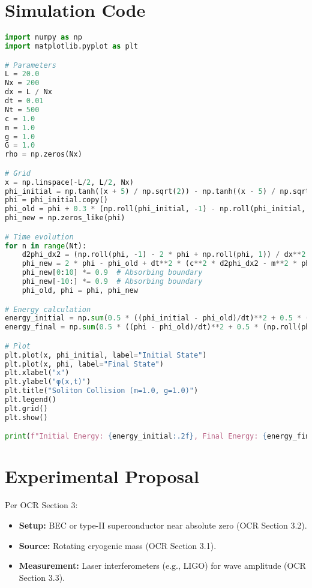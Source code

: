 \documentclass{article}
\begin{document}
\section{Simulation Code}
\begin{lstlisting}[language=Python, caption=Soliton Collision Simulation, label=lst:soliton]
import numpy as np
import matplotlib.pyplot as plt

# Parameters
L = 20.0
Nx = 200
dx = L / Nx
dt = 0.01
Nt = 500
c = 1.0
m = 1.0
g = 1.0
G = 1.0
rho = np.zeros(Nx)

# Grid
x = np.linspace(-L/2, L/2, Nx)
phi_initial = np.tanh((x + 5) / np.sqrt(2)) - np.tanh((x - 5) / np.sqrt(2))
phi = phi_initial.copy()
phi_old = phi + 0.3 * (np.roll(phi_initial, -1) - np.roll(phi_initial, 1)) / (2 * dx) * dt  # v1=0.3, v2=-0.3
phi_new = np.zeros_like(phi)

# Time evolution
for n in range(Nt):
    d2phi_dx2 = (np.roll(phi, -1) - 2 * phi + np.roll(phi, 1)) / dx**2  # Periodic boundaries
    phi_new = 2 * phi - phi_old + dt**2 * (c**2 * d2phi_dx2 - m**2 * phi - g * phi**3 + 8 * np.pi * G * rho)
    phi_new[0:10] *= 0.9  # Absorbing boundary
    phi_new[-10:] *= 0.9  # Absorbing boundary
    phi_old, phi = phi, phi_new

# Energy calculation
energy_initial = np.sum(0.5 * ((phi_initial - phi_old)/dt)**2 + 0.5 * (np.roll(phi_initial, -1) - phi_initial)/dx**2 + 0.5 * m**2 * phi_initial**2 + 0.25 * g * phi_initial**4)
energy_final = np.sum(0.5 * ((phi - phi_old)/dt)**2 + 0.5 * (np.roll(phi, -1) - phi)/dx**2 + 0.5 * m**2 * phi**2 + 0.25 * g * phi**4)

# Plot
plt.plot(x, phi_initial, label="Initial State")
plt.plot(x, phi, label="Final State")
plt.xlabel("x")
plt.ylabel("φ(x,t)")
plt.title("Soliton Collision (m=1.0, g=1.0)")
plt.legend()
plt.grid()
plt.show()

print(f"Initial Energy: {energy_initial:.2f}, Final Energy: {energy_final:.2f}, Change: {100 * (energy_initial - energy_final) / energy_initial:.2f}%")
\end{lstlisting}

\section{Experimental Proposal}
Per OCR Section 3:
\begin{itemize}
    \item \textbf{Setup:} BEC or type-II superconductor near absolute zero (OCR Section 3.2).
    \item \textbf{Source:} Rotating cryogenic mass (OCR Section 3.1).
    \item \textbf{Measurement:} Laser interferometers (e.g., LIGO) for wave amplitude (OCR Section 3.3).
\end{itemize}
\end{document}

